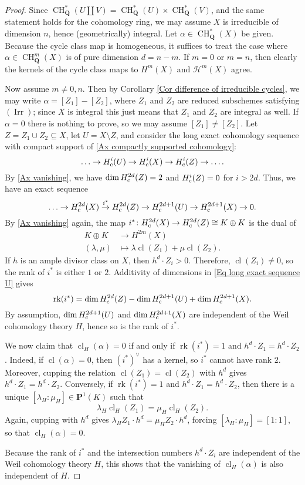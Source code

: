 \documentclass[11pt]{amsart}
\theoremstyle{definition}
\renewcommand{\H}{\mathcal H}
\renewcommand{\P}{\mathbf P}
\newcommand{\Q}{\mathbf Q}
\newcommand{\cs}{_{\text{\normalfont c}}}
\newcommand{\CH}{\operatorname{CH}}
\newcommand{\cl}{\operatorname{cl}}
\newcommand{\rk}{\operatorname{rk}}
\newcommand{\Irr}{\operatorname{Irr}}
\newcommand{\rA}{\longrightarrow}
\begin{document}
\begin{proof}
Since $\CH^*_\Q(U \amalg V) = \CH^*_\Q(U) \times \CH^*_\Q(V)$, and
the same statement holds for the cohomology ring, we may assume $X$
is irreducible of dimension $n$, hence (geometrically) integral.
Let $\alpha \in \CH^*_\Q(X)$ be given. Because the cycle class map
is homogeneous, it suffices to treat the case where $\alpha \in
\CH^m_\Q(X)$ is of pure dimension $d = n-m$. If $m = 0$ or $m = n$,
then clearly the kernels of the cycle class maps to $H^m(X)$ and
$\H^m(X)$ agree.

Now assume $m \neq 0,n$. Then by Corollary \ref{Cor difference of
irreducible cycles}, we may write $\alpha = [Z_1] - [Z_2]$, where
$Z_1$ and $Z_2$ are reduced subschemes satisfying $(\Irr)$; since
$X$ is integral this just means that $Z_1$ and $Z_2$ are integral as
well. If $\alpha = 0$ there is nothing to prove, so we may assume
$[Z_1] \neq [Z_2]$.  Let $Z = Z_1 \cup Z_2 \subseteq X$, let $U = X
\setminus Z$, and consider the long exact cohomology sequence with
compact support of \ref{Ax compactly supported cohomology}:
\[
\ldots \to H^i\cs(U) \to H^i\cs(X) \to H^i\cs(Z) \to \ldots.
\]
By \ref{Ax vanishing}, we have $\dim H\cs^{2d}(Z) = 2$ and
$H\cs^i(Z) = 0$ for $i > 2d$. Thus, we have an exact sequence
\begin{equation}
\ldots \to H\cs^{2d}(X) \stackrel{i^*}\to H\cs^{2d}(Z) \to
H\cs^{2d+1}(U) \to H\cs^{2d+1}(X) \to 0.\label{Eq long exact
sequence U}
\end{equation}
By \ref{Ax vanishing} again, the map $i^* \colon H\cs^{2d}(X) \to
H^{2d}\cs(Z) \cong K \oplus K$ is the dual of
\begin{align*}
K \oplus K &\rA H^{2m}(X)\\
(\lambda,\mu) &\longmapsto \lambda\cl(Z_1) + \mu\cl(Z_2).
\end{align*}
If $h$ is an ample divisor class on $X$, then $h^d \cdot Z_i > 0$.
Therefore, $\cl(Z_i) \neq 0$, so the rank of $i^*$ is either $1$ or
$2$. Additivity of dimensions in \eqref{Eq long exact sequence U}
gives
\[
\rk(i^*) = \dim H\cs^{2d}(Z) - \dim H\cs^{2d+1}(U) + \dim
H\cs^{2d+1}(X).
\]
By assumption, $\dim H^{2d+1}\cs(U)$ and $\dim H^{2d+1}\cs(X)$ are
independent of the Weil cohomology theory $H$, hence so is the rank
of $i^*$.

We now claim that $\cl_H(\alpha) = 0$ if and only if $\rk(i^*) = 1$
and $h^d \cdot Z_1 = h^d \cdot Z_2$. Indeed, if $\cl(\alpha) = 0$,
then $(i^*)^\vee$ has a kernel, so $i^*$ cannot have rank $2$.
Moreover, cupping the relation $\cl(Z_1) = \cl(Z_2)$ with $h^d$
gives $h^d \cdot Z_1 = h^d \cdot Z_2$. Conversely, if $\rk(i^*) = 1$
and $h^d \cdot Z_1 = h^d \cdot Z_2$, then there is a unique
$[\lambda_H:\mu_H] \in \P^1(K)$ such that
\[
\lambda_H\cl_H(Z_1) = \mu_H\cl_H(Z_2).
\]
Again, cupping with $h^d$ gives $\lambda_H Z_1 \cdot h^d = \mu_H Z_2
\cdot h^d$, forcing $[\lambda_H:\mu_H] = [1:1]$, so that
$\cl_H(\alpha) = 0$.

Because the rank of $i^*$ and the intersection numbers $h^d \cdot
Z_i$ are independent of the Weil cohomology theory $H$, this shows
that the vanishing of $\cl_H(\alpha)$ is also independent of $H$.
\end{proof}
\end{document}
